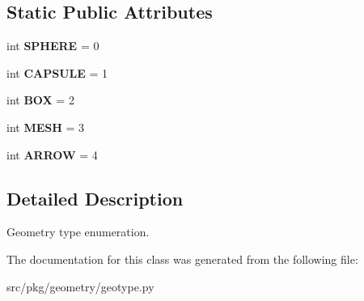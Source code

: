 \subsection*{Static Public Attributes}
\begin{DoxyCompactItemize}
\item 
\mbox{\label{classrnb-planning_1_1src_1_1pkg_1_1geometry_1_1geotype_1_1_g_e_o_t_y_p_e_aa16ff745abf9216823f9ba491404897c}} 
int {\bfseries S\+P\+H\+E\+RE} = 0
\item 
\mbox{\label{classrnb-planning_1_1src_1_1pkg_1_1geometry_1_1geotype_1_1_g_e_o_t_y_p_e_a9c794152250847ac6fe800d68d2530a8}} 
int {\bfseries C\+A\+P\+S\+U\+LE} = 1
\item 
\mbox{\label{classrnb-planning_1_1src_1_1pkg_1_1geometry_1_1geotype_1_1_g_e_o_t_y_p_e_a2269480f84d6e47abd80d4006d258766}} 
int {\bfseries B\+OX} = 2
\item 
\mbox{\label{classrnb-planning_1_1src_1_1pkg_1_1geometry_1_1geotype_1_1_g_e_o_t_y_p_e_a93986893f0a3e1f89712e16febe663a7}} 
int {\bfseries M\+E\+SH} = 3
\item 
\mbox{\label{classrnb-planning_1_1src_1_1pkg_1_1geometry_1_1geotype_1_1_g_e_o_t_y_p_e_aa3f797aa40564b5970b2a1c08e6bb864}} 
int {\bfseries A\+R\+R\+OW} = 4
\end{DoxyCompactItemize}


\subsection{Detailed Description}
Geometry type enumeration. 

The documentation for this class was generated from the following file\+:\begin{DoxyCompactItemize}
\item 
src/pkg/geometry/geotype.\+py\end{DoxyCompactItemize}
